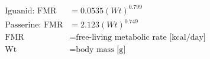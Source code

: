 \documentclass[fleqn, oneside, 11pt]{article}%
\begin{document}
\begin{preview}
\begin{align*}%
\text{Iguanid: FMR} & = 0.0535(Wt)^{0.799} \nonumber \\
\text{Passerine: FMR} & =  2.123(Wt)^{0.749} \nonumber \\
\text{FMR} & = \text{free-living metabolic rate [kcal/day]} \nonumber \\
\text{Wt} & = \text{body mass [g]} \nonumber \\
\end{align*} 
\end{preview}
\end{document}
